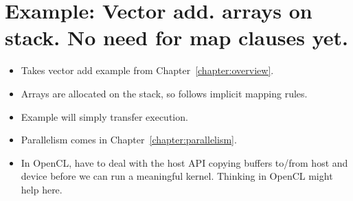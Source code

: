 \section{Example: Vector add. arrays on stack. No need for map clauses yet.}
\begin{itemize}
  \item Takes vector add example from Chapter~\ref{chapter:overview}.
  \item Arrays are allocated on the stack, so follows implicit mapping rules.
  \item Example will simply transfer execution.
  \item Parallelism comes in Chapter~\ref{chapter:parallelism}.
  \item In OpenCL, have to deal with the host API copying buffers to/from host and device before we can run a meaningful kernel. Thinking in OpenCL might help here.
\end{itemize}


